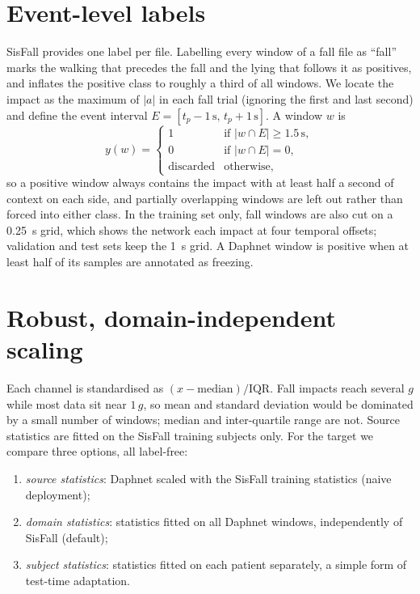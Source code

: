 \section{Event-level labels}
\label{sec:labels}

SisFall provides one label per file. Labelling every window of a fall file as ``fall'' marks the
walking that precedes the fall and the lying that follows it as positives, and inflates the positive
class to roughly a third of all windows. We locate the impact as the maximum of $|a|$ in each
fall trial (ignoring the first and last second) and define the event interval $E=[t_p-1\,\mathrm{s},\,
t_p+1\,\mathrm{s}]$. A window $w$ is
\begin{equation}
y(w)=\begin{cases}
1 & \text{if } |w\cap E|\geq 1.5\,\mathrm{s},\\
0 & \text{if } |w\cap E| = 0,\\
\text{discarded} & \text{otherwise,}
\end{cases}
\end{equation}
so a positive window always contains the impact with at least half a second of context on each
side, and partially overlapping windows are left out rather than forced into either class. In the
training set only, fall windows are also cut on a \SI{0.25}{\second} grid, which shows the network each
impact at four temporal offsets; validation and test sets keep the \SI{1}{\second} grid. A Daphnet window
is positive when at least half of its samples are annotated as freezing.

\section{Robust, domain-independent scaling}
\label{sec:scaling}

Each channel is standardised as $(x-\mathrm{median})/\mathrm{IQR}$. Fall impacts reach several $g$
while most data sit near $1\,g$, so mean and standard deviation would be dominated by a small number
of windows; median and inter-quartile range are not. Source statistics are fitted on the SisFall
training subjects only. For the target we compare three options, all label-free:
\begin{enumerate}
  \item \emph{source statistics}: Daphnet scaled with the SisFall training statistics (naive deployment);
  \item \emph{domain statistics}: statistics fitted on all Daphnet windows, independently of SisFall (default);
  \item \emph{subject statistics}: statistics fitted on each patient separately, a simple form of test-time adaptation.
\end{enumerate}

